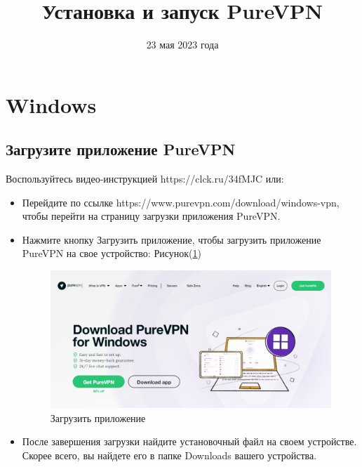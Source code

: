

\title{Установка и запуск PureVPN} 
\date{23 мая 2023 года}
\author{}



\maketitle
\newpage
\tableofcontents
\newpage

\section{Windows}

\subsection{Загрузите приложение PureVPN} 
Воспользуйтесь видео-инструкцией https://clck.ru/34fMJC или:
\begin{itemize}
\item Перейдите по ссылке https://www.purevpn.com/download/windows-vpn, чтобы перейти на страницу загрузки приложения PureVPN.
\item Нажмите кнопку Загрузить приложение, чтобы загрузить приложение PureVPN на свое устройство:  Рисунок(\ref{fig:1})
\begin{figure}[H]
\includegraphics[width=14cm]{1.png}
\centering
\caption{Загрузить приложение}
\label{fig:1}
\end{figure}
\item После завершения загрузки найдите установочный файл на своем устройстве. Скорее всего, вы найдете его в папке Downloads вашего устройства.
\end{itemize}

